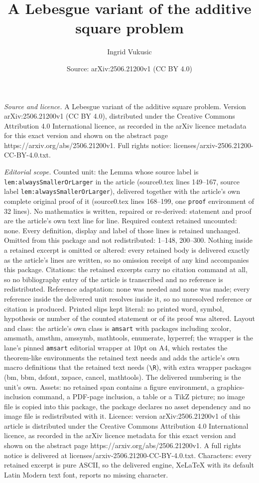 \documentclass[10pt,a4paper]{amsart}
\title[A Lebesgue variant of the additive square problem]{A Lebesgue variant of the additive square problem}
\author{Ingrid Vukusic}
\date{Source: arXiv:2506.21200v1 (CC BY 4.0)}
\begin{document}
\maketitle

\noindent\emph{Source and licence.} A Lebesgue variant of the additive square problem. Version arXiv:2506.21200v1 (CC BY 4.0), distributed under the Creative Commons Attribution 4.0 International licence, as recorded in the arXiv licence metadata for this exact version and shown on the abstract page https://arxiv.org/abs/2506.21200v1. Full rights notice: licenses/arxiv-2506.21200-CC-BY-4.0.txt.\par\smallskip

\noindent\textit{Editorial scope.} Counted unit: the Lemma whose source label is \texttt{lem:alwaysSmallerOrLarger} in the article (source0.tex lines 149--167, source label \texttt{lem:alwaysSmallerOrLarger}), delivered together with the article's own complete original proof of it (source0.tex lines 168--199, one \texttt{proof} environment of 32 lines). No mathematics is written, repaired or re-derived: statement and proof are the article's own text line for line. Required context retained uncounted: none. Every definition, display and label of those lines is retained unchanged. Omitted from this package and not redistributed: 1--148, 200--300. Nothing inside a retained excerpt is omitted or altered: every retained body is delivered exactly as the article's lines are written, so no omission receipt of any kind accompanies this package. Citations: the retained excerpts carry no citation command at all, so no bibliography entry of the article is transcribed and no reference is redistributed. Reference adaptation: none was needed and none was made; every reference inside the delivered unit resolves inside it, so no unresolved reference or citation is produced. Printed slips kept literal: no printed word, symbol, hypothesis or number of the counted statement or of its proof was altered. Layout and class: the article's own class is \texttt{amsart} with packages including xcolor, amsmath, amsthm, amssymb, mathtools, enumerate, hyperref; the wrapper is the lane's pinned \texttt{amsart} editorial wrapper at 10pt on A4, which restates the theorem-like environments the retained text needs and adds the article's own macro definitions that the retained text needs (\texttt{\textbackslash R}), with extra wrapper packages (bm, bbm, dsfont, xspace, cancel, mathtools). The delivered numbering is the unit's own. Assets: no retained span contains a figure environment, a graphics-inclusion command, a PDF-page inclusion, a table or a TikZ picture; no image file is copied into this package, the package declares no asset dependency and no image file is redistributed with it. Licence: version arXiv:2506.21200v1 of this article is distributed under the Creative Commons Attribution 4.0 International licence, as recorded in the arXiv licence metadata for this exact version and shown on the abstract page https://arxiv.org/abs/2506.21200v1. A full rights notice is delivered at licenses/arxiv-2506.21200-CC-BY-4.0.txt. Characters: every retained excerpt is pure ASCII, so the delivered engine, XeLaTeX with its default Latin Modern text font, reports no missing character.
\end{document}
